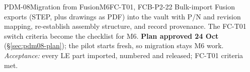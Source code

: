 \begin{epic}{PDM-08}{Migration from Fusion}{M6}{\stTodo}{FC-T01, FCB-P2-22}
Bulk-import Fusion exports (STEP, plus drawings as PDF) into the vault with P/N and revision mapping,
re-establish assembly structure, and record provenance. The FC-T01 switch criteria become the checklist for
M6. \textbf{Plan approved 24 Oct} (\S\ref{sec:pdm08-plan}); the pilot starts fresh, so migration stays M6 work.
\emph{Acceptance:} every LE part imported, numbered and released; FC-T01 criteria met.
\end{epic}
